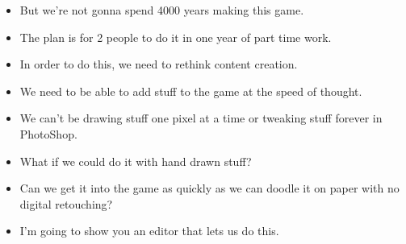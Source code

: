 \documentclass[12pt]{article}
\begin{document}
{\begin{itemize}
\item But we're not gonna spend 4000 years making this game.

\item The plan is for 2 people to do it in one year of part time work.

\item In order to do this, we need to rethink content creation.

\item We need to be able to add stuff to the game at the speed of thought.

\item We can't be drawing stuff one pixel at a time or tweaking stuff forever in PhotoShop.

\item What if we could do it with hand drawn stuff?

\item Can we get it into the game as quickly as we can doodle it on paper with no digital retouching?

\item I'm going to show you an editor that lets us do this.

\end{itemize}

}
\end{document}
